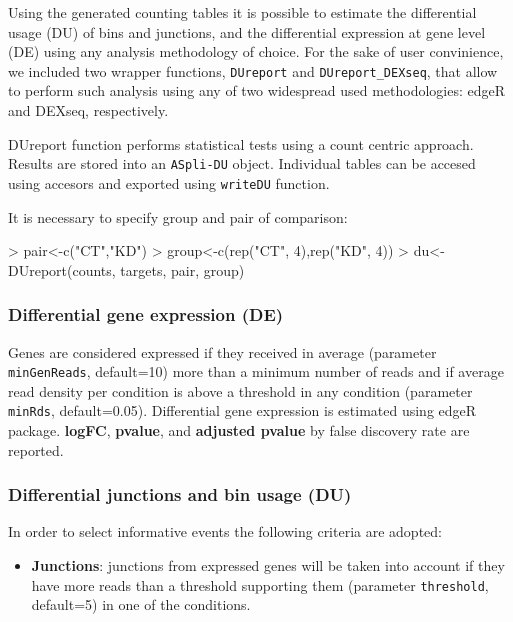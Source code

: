 \documentclass{article}
\begin{document}
Using the generated counting tables it is possible to estimate the differential usage (DU) of bins and junctions, and the differential expression at gene level (DE) using any analysis methodology of choice. For the sake of user convinience, we included two wrapper functions, \texttt{DUreport} and \texttt{DUreport\_DEXseq}, that allow to perform such analysis using any of two widespread used methodologies: edgeR and DEXseq, respectively.

DUreport function performs statistical tests using a count centric approach. Results are stored into an \texttt{ASpli-DU} object. Individual tables can be accesed using accesors and exported using \texttt{writeDU} function.

It is necessary to specify group and pair of comparison:
\begin{Schunk}
\begin{Sinput}
> pair<-c("CT","KD")
> group<-c(rep("CT", 4),rep("KD", 4))
> du<-DUreport(counts, targets, pair, group)
\end{Sinput}
\end{Schunk}

\subsubsection{Differential gene expression (DE)}
Genes are considered expressed if they received in average (parameter \texttt{minGenReads}, default=10)  more than a minimum number of reads  and if average read density per condition is above a threshold in any condition (parameter \texttt{minRds}, default=0.05). Differential gene expression is estimated using edgeR \cite{Robinson2012} package. \textbf{logFC}, \textbf{pvalue}, and \textbf{adjusted pvalue} by false discovery rate \cite{fdr} are reported. 

\subsubsection{Differential junctions and bin usage (DU)}
In order to select informative events the following criteria are adopted:
  
\begin{itemize}
\item \textbf{Junctions}: junctions from expressed genes will be taken into account if they have more reads than a threshold supporting them (parameter \texttt{threshold}, default=5) in one of the conditions. 
\end{itemize}
\end{document}
